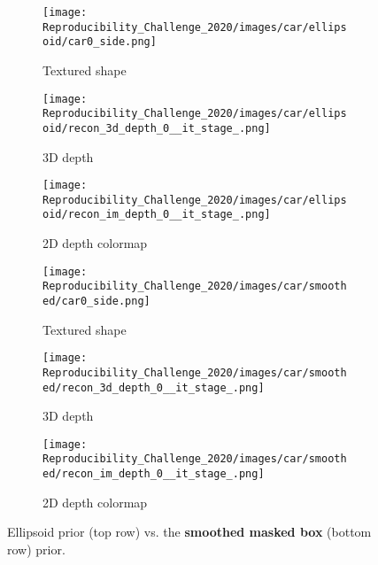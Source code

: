 \begin{figure}[!htb]
    \centering
    \begin{subfigure}[t]{0.28\textwidth}
        \centering
        \texttt{[image: Reproducibility\_Challenge\_2020/images/car/ellipsoid/car0\_side.png]}
        \caption{Textured shape}
        \label{}
    \end{subfigure}
    \begin{subfigure}[t]{0.28\textwidth}
        \centering
        \texttt{[image: Reproducibility\_Challenge\_2020/images/car/ellipsoid/recon\_3d\_depth\_0\_\_it\_stage\_.png]}
        \caption{3D depth}
        \label{}
    \end{subfigure}
    \begin{subfigure}[t]{0.28\textwidth}
        \centering
        \texttt{[image: Reproducibility\_Challenge\_2020/images/car/ellipsoid/recon\_im\_depth\_0\_\_it\_stage\_.png]}
        \caption{2D depth colormap}
        \label{}
    \end{subfigure}
    \begin{subfigure}[t]{0.28\textwidth}
        \centering
        \texttt{[image: Reproducibility\_Challenge\_2020/images/car/smoothed/car0\_side.png]}
        \caption{Textured shape}
        \label{}
    \end{subfigure}
    \begin{subfigure}[t]{0.28\textwidth}
        \centering
        \texttt{[image: Reproducibility\_Challenge\_2020/images/car/smoothed/recon\_3d\_depth\_0\_\_it\_stage\_.png]}
        \caption{3D depth}
        \label{}
    \end{subfigure}
    \begin{subfigure}[t]{0.28\textwidth}
        \centering
        \texttt{[image: Reproducibility\_Challenge\_2020/images/car/smoothed/recon\_im\_depth\_0\_\_it\_stage\_.png]}
        \caption{2D depth colormap}
        \label{}
    \end{subfigure}
    \caption{Ellipsoid prior (top row) vs. the \textbf{smoothed masked box} (bottom row) prior.}
    \label{fig:3d_depth_diff_priors}
\end{figure}


